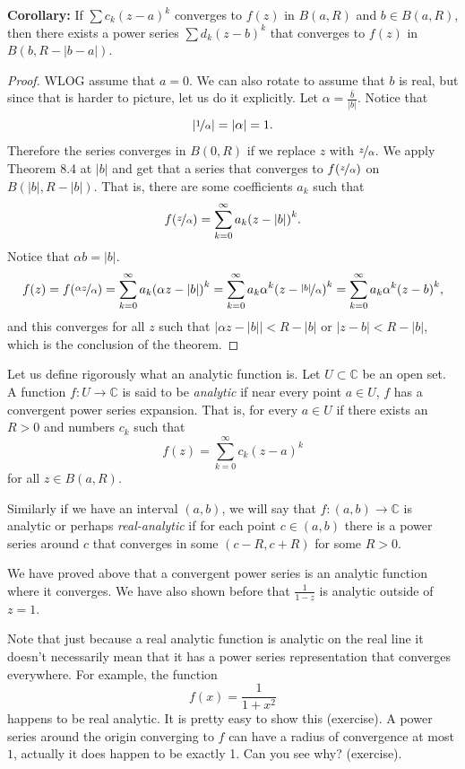 \documentclass[12pt]{book}
\newcommand{\abs}[1]{\left\lvert {#1} \right\rvert}
\newcommand{\C}{{\mathbb{C}}}
\theoremstyle{plain}
\theoremstyle{remark}
\theoremstyle{definition}
\theoremstyle{exercise}
\theoremstyle{example}
\begin{document}
\textbf{Corollary:}
If $\sum c_k {(z-a)}^k$ converges to $f(z)$ in $B(a,R)$ and $b \in B(a,R)$,
then there exists a power series
$\sum d_k {(z-b)}^k$ that converges to $f(z)$ in $B(b,R-\abs{b-a})$.

\medskip

\begin{proof}
WLOG assume that $a=0$.  We can also rotate to assume that $b$ is real, but
since that is harder to picture, let us do it explicitly.
Let $\alpha = \frac{\bar{b}}{\abs{b}}$.
Notice that
$$
\abs{\nicefrac{1}{\alpha}} = \abs{\alpha} %
= 1 .
$$
Therefore the series converges in $B(0,R)$
if we replace $z$ with $\nicefrac{z}{\alpha}$.
We apply Theorem 8.4 at $\abs{b}$ and get that a series that converges
to $f(\nicefrac{z}{\alpha})$ on $B(\abs{b},R-\abs{b})$.
That is, there are some coefficients $a_k$ such that
$$
f(\nicefrac{z}{\alpha}) =
\sum_{k=0}^\infty a_k {(z - \abs{b})}^k .
$$
Notice that $\alpha b = \abs{b}$.
$$
f(z) = f(\nicefrac{\alpha z}{\alpha}) =
\sum_{k=0}^\infty a_k {(\alpha z - \abs{b})}^k 
=
\sum_{k=0}^\infty a_k\alpha^k {(z - \nicefrac{\abs{b}}{\alpha})}^k
=
\sum_{k=0}^\infty a_k\alpha^k {(z - b)}^k ,
$$
and this converges for all $z$ such that
$\bigl\lvert \alpha z-\abs{b}\bigr\rvert < R-\abs{b}$
or $\abs{z - b} < R-\abs{b}$, which is the conclusion of the theorem.
\end{proof}

\medskip

Let us define rigorously what an analytic function is.
Let $U \subset \C$ be an open set.  A function $f \colon U \to \C$
is said to be \emph{analytic} if near every point $a \in U$, $f$ has a
convergent power series expansion.  That is, for every $a \in U$ if there exists an $R > 0$
and numbers $c_k$ such that
$$
f(z) = \sum_{k=0}^\infty c_k {(z-a)}^k
$$
for all $z \in B(a,R)$.

Similarly if we have an interval $(a,b)$, we will say that $f \colon (a,b)
\to \C$ is analytic or perhaps \emph{real-analytic} if for each point $c \in
(a,b)$ there is a power series around $c$ that converges in some $(c-R,c+R)$
for some $R > 0$.

We have proved above that a convergent power series is an
analytic function where it converges.  We have also shown before that
$\frac{1}{1-z}$ is analytic outside of $z=1$.

Note that just because a real analytic function is analytic on the
real line it doesn't necessarily mean that it has a power series
representation that converges everywhere.  For example, the function
$$
f(x) = \frac{1}{1+x^2}
$$
happens to be real analytic.  It is pretty easy to show this (exercise).  A power
series around the origin converging to $f$ can have a radius of convergence at most $1$,
actually it does happen to be exactly 1.  Can you see why? (exercise).
\end{document}

